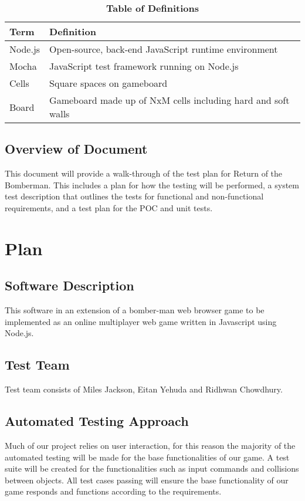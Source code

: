 \documentclass[12pt, titlepage]{article}
\begin{document}
\begin{table}[!htbp]
\caption{\textbf{Table of Definitions}} \label{Table}

\begin{tabularx}{\textwidth}{p{3cm}X}
\toprule
\textbf{Term} & \textbf{Definition}\\
\midrule
Node.js & Open-source, back-end JavaScript runtime environment\\
Mocha & JavaScript test framework running on Node.js\\
Cells & Square spaces on gameboard\\
Board & Gameboard made up of NxM cells including hard and soft walls\\
\bottomrule
\end{tabularx}

\end{table}	

\subsection{Overview of Document}

This document will provide a walk-through of the test plan for Return of the Bomberman. This includes a plan for how the testing will be performed, a system test description that outlines the tests for functional and non-functional requirements, and a test plan for the POC and unit tests.

\section{Plan}
	
\subsection{Software Description}
This software in an extension of a bomber-man web browser game to be implemented as an online multiplayer web game written in Javascript using Node.js.
\subsection{Test Team}
Test team consists of Miles Jackson, Eitan Yehuda and Ridhwan Chowdhury.

\subsection{Automated Testing Approach}
Much of our project relies on user interaction, for this reason the majority of the automated testing will be made for the base functionalities of our game. A test suite will be created  for the functionalities such as input commands and collisions between objects. All test cases passing will ensure the base functionality of our game responds and functions according to the requirements.
\end{document}
